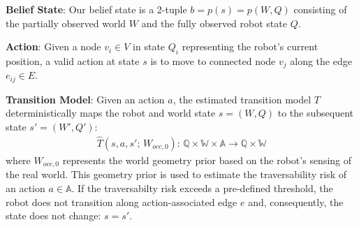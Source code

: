 \documentclass{article}
\newcommand{\ph}[1]{{\textbf{#1}:}} %
\begin{document}
\ph{Belief State} Our belief state is a 2-tuple $b = p(s) = p(W,Q)$ consisting of the partially observed world $W$ and the fully observed robot state $Q$.

\ph{Action} Given a node $v_i \in V$ in state $Q_i$ representing the robot's current position, a valid action at state $s$ is to move to connected node $v_j$ along the edge $e_{ij} \in E$. 








\ph{Transition Model} Given an action $a$, the estimated transition model $T$ deterministically maps the robot and world state $s = (W, Q)$ to the subsequent state $s' = (W', Q')$:
\begin{align}
    \hat{T}(s, a, s'; \, W_{occ,0}): \, \mathbb{Q} \times \mathbb{W} \times \mathbb{A} \rightarrow \mathbb{Q} \times \mathbb{W}
\end{align}
where $W_{occ,0}$ represents the world geometry prior based on the robot's sensing of the real world. This geometry prior is used to estimate the traversability risk of an action $a \in \mathbb{A}$. If the traversabilty risk exceeds a pre-defined threshold, the robot does not transition along action-associated edge $e$ and, consequently, the state does not change: $s = s'$.

\end{document}
